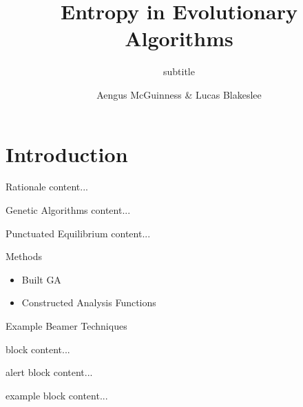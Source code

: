 \documentclass{beamer}
\title{Entropy in Evolutionary Algorithms}
\subtitle{subtitle}
\author{Aengus McGuinness \& Lucas Blakeslee}
\begin{document}
	
\begin{frame}
\begin{titlepage}
\end{titlepage}
\end{frame}

\section{Introduction}

\begin{frame}{Rationale}
	content...
\end{frame}


\begin{frame}{Genetic Algorithms}
	content...
\end{frame}

\begin{frame}{Punctuated Equilibrium}
	content...
\end{frame}

\begin{frame}{Methods}
	\begin{itemize}
		\item Built GA
		\item Constructed Analysis Functions
	\end{itemize}
\end{frame}

\begin{frame}{Example Beamer Techniques}
	\begin{block}{block}
		content...
	\end{block}
	\begin{alertblock}{alert block}
		content...
	\end{alertblock}
	\begin{exampleblock}{example block}
		content...
	\end{exampleblock}
\end{frame}
\end{document}
